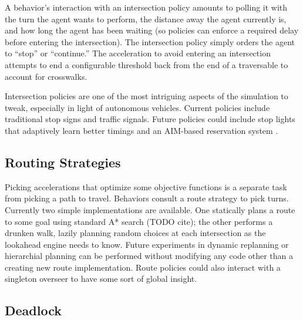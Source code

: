 \documentclass[letterpaper, 10 pt, conference]{ieeeconf}  %
\begin{document}
A behavior's interaction with an intersection policy amounts to polling it with
the turn the agent wants to perform, the distance away the agent currently is,
and how long the agent has been waiting (so policies can enforce a required
delay before entering the intersection). The intersection policy simply orders
the agent to ``stop'' or ``continue.'' The acceleration to avoid entering an intersection
attempts to end a configurable threshold back from the end of a traversable to
account for crosswalks.

Intersection policies are one of the most intriguing aspects of the simulation
to tweak, especially in light of autonomous vehicles. Current policies include
traditional stop signs and traffic signals. Future policies could include stop
lights that adaptively learn better timings and an AIM-based reservation system
\cite{JAIR08-dresner}. 




\subsection{Routing Strategies}

Picking accelerations that optimize some objective functions is a separate task
from picking a path to travel. Behaviors consult a route strategy to pick turns.
Currently two simple implementations are available. One statically plans a route
to some goal using standard A* search (TODO cite); the other performs a drunken
walk, lazily planning random choices at each intersection as the lookahead
engine needs to know. Future experiments in dynamic replanning or hierarchial
planning can be performed without modifying any code other than a creating new
route implementation. Route policies could also interact with a singleton
overseer to have some sort of global insight.

\subsection{Deadlock}
\end{document}

